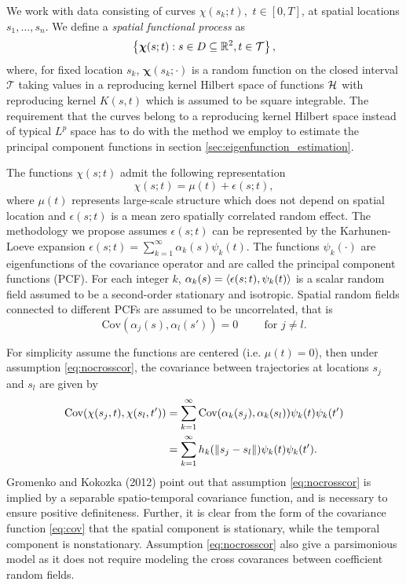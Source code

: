 \label{sec:statistical_model_for_spatially_indexed_functional_data}

We work with data consisting of curves $\chi(s_k; t),$ $t \in [0,T]$, at spatial locations $s_1, \dots, s_n$. We define a \emph{spatial functional process} as
\[ \left\{ \boldsymbol\chi(s; t): s \in D \subseteq  \mathbb{R} ^2, t \in \mathcal{T} \right\}, \]
where, for fixed location $s_k$, $\boldsymbol\chi(s_k; \cdot)$ is a random function on the closed interval $\mathcal{T}$ taking values in a reproducing kernel Hilbert space of functions $\mathcal{H}$ with reproducing kernel $K(s,t)$ which is assumed to be square integrable. The requirement that the curves belong to a reproducing kernel Hilbert space instead of typical $L^p$ space has to do with the method we employ to estimate the principal component functions in section \ref{sec:eigenfunction_estimation}.

The functions $\chi(s;t)$ admit the following representation 
\begin{equation}
	\chi(s;t) = \mu(t) + \epsilon(s;t), 
\end{equation}
where $\mu(t)$ represents large-scale structure which does not depend on spatial location and $\epsilon(s;t)$ is a mean zero spatially correlated random effect. The methodology we propose assumes $\epsilon(s;t)$ can be represented by the Karhunen-Loeve expansion $\epsilon(s;t) = \sum_{k=1}^{\infty} \alpha_k(s)\psi_k(t)$. The functions $\psi_k(\cdot)$ are eigenfunctions of the covariance operator and are called the principal component functions (PCF). For each integer $k$, $\alpha_k(s) = \langle \epsilon(s;t),  \psi_k(t) \rangle$ is a scalar random field assumed to be a second-order stationary and isotropic. Spatial random fields connected to different PCFs are assumed to be uncorrelated, that is 
\begin{equation}
	\text{Cov}(\alpha_j(s), \alpha_l(s')) = 0 \hspace{1cm} \text{for } j \neq l. \label{eq:nocrosscor} 
\end{equation}

For simplicity assume the functions are centered (i.e. $\mu(t)=0$), then under assumption \eqref{eq:nocrosscor}, the covariance between trajectories at locations $s_j$ and $s_l$ are given by 
\begin{align}
	\text{Cov}(\chi(s_j,t), \chi(s_l, t')) &= \sum_{k=1}^{\infty}\text{Cov}(\alpha_k(s_j), \alpha_k(s_l))\psi_k(t)\psi_k(t')\\
	&= \sum_{k=1}^{\infty}h_k(\left\|s_j-s_l\right\|)\psi_k(t)\psi_k(t'). \label{eq:cov} 
\end{align}
Gromenko and Kokozka (2012) point out that assumption \eqref{eq:nocrosscor} is implied by a separable spatio-temporal covariance function, and is necessary to ensure positive definiteness. Further, it is clear from the form of the covariance function \eqref{eq:cov} that the spatial component is stationary, while the temporal component is nonstationary. Assumption \ref{eq:nocrosscor} also give a parsimonious model as it does not require modeling the cross covarances between coefficient random fields. 

